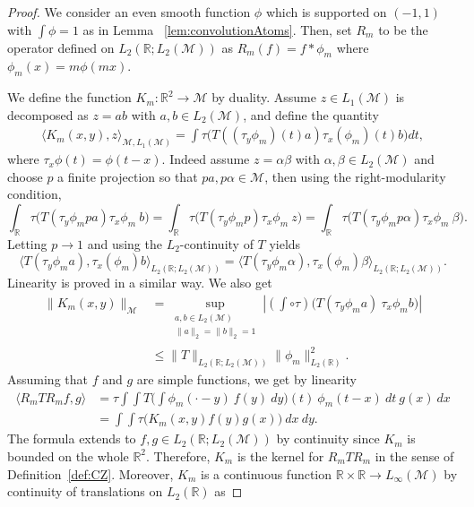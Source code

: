 \documentclass[psamsfonts]{amsart}
\newcommand{\R}{\mathbb{R}}
\newcommand{\la}{\langle}
\newcommand{\Lone}{L_1}
\newcommand{\Linfty}{L_\infty}
\newcommand{\Ltwo}{L_2}
\begin{document}
    
    \begin{proof} 
    We consider an even smooth function $\phi$ which is supported on $(-1,1)$ with
      $\int \phi = 1$ as in Lemma ~\ref{lem:convolutionAtoms}. Then, set $R_m$ to be the operator defined on
      $\Ltwo(\mathbb{R};\Ltwo(\mathcal{M}))$ as $R_m(f) = f * \phi_m$
      where $\phi_m(x) = m \phi(mx)$.
    
      We define the function $K_m:\R^2\to \mathcal M$ by duality. Assume
        $z\in \Lone(\mathcal M)$ is decomposed as $z=ab$ with $a,b\in \Ltwo(\mathcal M)$, and define the quantity 
      \begin{align}\label{formulaKm}
        \la K_m(x,y),z\rangle_{\mathcal M,\Lone(\mathcal M)}  =
        \int \tau\big(T((\tau_y\phi_m)(t)a)\tau_x ({\phi}_m)(t)b\big) dt,
      \end{align}
      where $\tau_x \phi(t) = \phi(t-x)$. Indeed assume $z=\alpha\beta$ with $\alpha,\beta\in \Ltwo(\mathcal M)$ and choose $p$ a
      finite projection so that $pa, p\alpha\in \mathcal M$, then using the right-modularity condition,
      $$\int_\R \tau\big(T(\tau_y\phi_mpa)\tau_x{\phi}_m \ b\big)= \int_\R \tau\big(T(\tau_y\phi_m p)\tau_x \phi_m \ z\big)=\int_\R \tau\big(T(\tau_y\phi_m p\alpha)\tau_x\phi_m \ \beta\big).$$
      Letting $p\to 1$ and using the $L_2$-continuity of $T$ yields
      $$\langle T(\tau_y\phi_ma), \tau_x ({\phi}_m)b \rangle_{\Ltwo(\R;\Ltwo(\mathcal M))}=\langle T(\tau_y\phi_m\alpha), \tau_x ({\phi}_m)\beta \rangle_{\Ltwo(\R;\Ltwo(\mathcal M))}.$$      
      Linearity is proved in a similar way. We also get
      \begin{align*}
            \|K_m(x,y)\|_{\mathcal{M}} &= \sup_{\substack{{a,b\in \Ltwo(\mathcal M)}\\ \|a\|_2=\|b\|_2=1}} | (\int \circ \tau) \big(T(\tau_y \phi_ma)  \ \tau_x {\phi}_m  b \big) | \\
            &\leq \|T\|_{\Ltwo(\R;\Ltwo(\mathcal M))}  \| \phi_m\|_{\Ltwo(\mathbb{R})}^2.
        \end{align*}
        Assuming that $f$ and $g$ are simple functions, we get by linearity 
\begin{align*}
  \langle R_m T R_m f , g \rangle &= \tau \int \int T\Big(\int \phi_m(\cdot-y) \ f(y) \ dy\Big)(t) \ \phi_m(t-x) \ dt \ g(x) \ dx\\
  &= \int\int \tau\big(K_m(x,y)f(y)g(x)\big) \ dx \ dy.
\end{align*}
The formula extends to $f,g\in \Ltwo(\R;\Ltwo(\mathcal M))$ by continuity since $K_m$ is bounded on the whole $\R^2$. Therefore, $K_m$ is the kernel for $R_m T R_m$ in the sense of Definition~\ref{def:CZ}. Moreover, $K_m$ is a continuous function $\R\times\R \to \Linfty(\mathcal M)$ by continuity of translations on $\Ltwo(\R)$ as

\end{proof}
\end{document}
